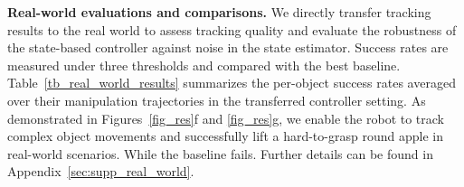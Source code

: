 \noindent\textbf{Real-world evaluations and comparisons.} 
We directly transfer tracking results to the real world to assess tracking quality and evaluate the robustness of the state-based controller against noise in the state estimator. Success rates are measured under three thresholds and compared with the best baseline. Table~\ref{tb_real_world_results} summarizes the per-object success rates averaged over their manipulation trajectories in the transferred controller setting. As demonstrated in Figures~\ref{fig_res}f and \ref{fig_res}g, we enable the robot to track complex object movements and successfully lift a hard-to-grasp round apple in real-world scenarios. While the baseline fails. Further details can be found in Appendix~\ref{sec:supp_real_world}.





